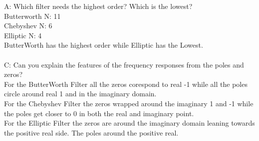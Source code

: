 
{\LARGE A:}
Which filter needs the highest order? Which is the lowest?\\

Butterworth N: 11\\
Chebyshev N: 6\\
Elliptic N: 4\\

ButterWorth has the highest order while Elliptic has the Lowest.\\ \\ 


{\LARGE C:}
Can you explain the features of the frequency responses from the poles and zeros?\\

For the ButterWorth Filter all the zeros corespond to real -1 while all the poles circle around real 1 and in the imaginary domain.\\

For the Chebyshev Filter the zeros wrapped around the imaginary 1 and -1 while the poles get closer to 0 in both the real and imaginary point.\\

For the Elliptic Filter the zeros are around the imaginary domain leaning towards the positive real side. The poles around the positive real. 


